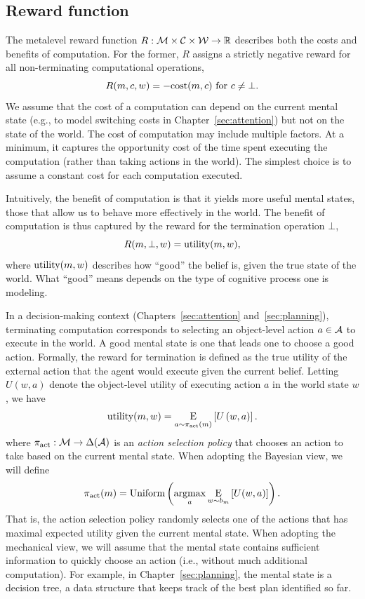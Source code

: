 \subsection{Reward function}
The metalevel reward function $R: \M \times \C \times \W \rightarrow \R$ describes both the costs and benefits of computation. For the former, $R$ assigns a strictly negative reward for all non-terminating computational operations,
%
\begin{equation}
R(m, c, w) = -\cost(m, c) \text{ for } c \neq \bot.
\end{equation}
%
We assume that the cost of a computation can depend on the current mental state (e.g., to model switching costs in Chapter~\ref{sec:attention}) but not on the state of the world. The cost of computation may include multiple factors. At a minimum, it captures the opportunity cost of the time spent executing the computation (rather than taking actions in the world). The simplest choice is to assume a constant cost for each computation executed.

Intuitively, the benefit of computation is that it yields more useful mental states, those that allow us to behave more effectively in the world. The benefit of computation is thus captured by the reward for the termination operation $\bot$,
%
\begin{equation}
  R(m, \bot, w) = \utility(m, w),
\end{equation}
%
where $\utility(m, w)$ describes how ``good'' the belief is, given the true state of the world. What ``good'' means depends on the type of cognitive process one is modeling. 

In a decision-making context (Chapters~\ref{sec:attention} and~\ref{sec:planning}), terminating computation corresponds to selecting an object-level action $a \in \A$ to execute in the world. A good mental state is one that leads one to choose a good action. Formally, the reward for termination is defined as the true utility of the external action that the agent would execute given the current belief. Letting $U(w, a)$ denote the object-level utility of executing action $a$ in the world state $w$, we have
%
\begin{equation}\label{eq:term-reward}
\utility(m, w) = \expectunder{U\left(w, a\right)}{a \sim \pi\act(m)}.
\end{equation}
%
where $\pi\act: \M \rightarrow \Delta(\A)$ is an \emph{action selection policy} that chooses an action to take based on the current mental state. When adopting the Bayesian view, we will define
\begin{equation}
  \pi\act(m) = \text{Uniform} \left(\argmax_a \expectunder{U(w, a)}{w \sim b_m}\right).
\end{equation}
%
That is, the action selection policy randomly selects one of the actions that has maximal expected utility given the current mental state. When adopting the mechanical view, we will assume that the mental state contains sufficient information to quickly choose an action (i.e., without much additional computation). For example, in Chapter~\ref{sec:planning}, the mental state is a decision tree, a data structure that keeps track of the best plan identified so far.

